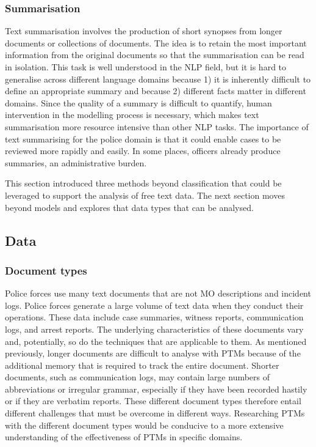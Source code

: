 \subsubsection{Summarisation} Text summarisation involves the production of short synopses from longer documents or collections of documents. The idea is to retain the most important information from the original documents so that the summarisation can be read in isolation. This task is well understood in the NLP field, but it is hard to generalise across different language domains because 1) it is inherently difficult to define an appropriate summary and because 2) different facts matter in different domains. Since the quality of a summary is difficult to quantify, human intervention in the modelling process is necessary, which makes text summarisation more resource intensive than other NLP tasks. The importance of text summarising for the police domain is that it could enable cases to be reviewed more rapidly and easily. In some places, officers already produce summaries, an administrative burden.

This section introduced three methods beyond classification that could be leveraged to support the analysis of free text data. The next section moves beyond models and explores that data types that can be analysed.  


\subsection{Data}

\subsubsection{Document types} Police forces use many text documents that are not MO descriptions and incident logs. Police forces generate a large volume of text data when they conduct their operations. These data include case summaries, witness reports, communication logs, and arrest reports. The underlying characteristics of these documents vary and, potentially, so do the techniques that are applicable to them. As mentioned previously, longer documents are difficult to analyse with PTMs because of the additional memory that is required to track the entire document. Shorter documents, such as communication logs, may contain large numbers of abbreviations or irregular grammar, especially if they have been recorded hastily or if they are verbatim reports. These different document types therefore entail different challenges that must be overcome in different ways. Researching PTMs with the different document types would be conducive to a more extensive understanding of the effectiveness of PTMs in specific domains.

